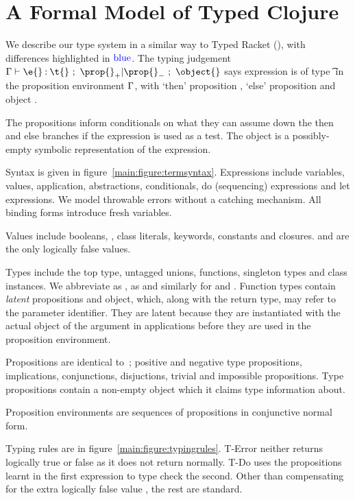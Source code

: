 \section{A Formal Model of Typed Clojure}

We describe our type system in a similar way to Typed Racket (\citet{TF10}),
with differences highlighted in $\mathbin{\textcolor{blue}{\text{blue}}}$.
The typing judgement 
$
{\judgement   {\propenv}
              {\hastype {\e{}} {\t{}}}
  {\filterset {\thenprop {\prop{}}}
              {\elseprop {\prop{}}}}
  {\object{}}}
$
says expression \e{} is of type \t{} in the 
proposition environment $\Gamma{}$, with 
`then' proposition {\thenprop {\prop{}}}, `else' proposition {\elseprop {\prop{}}}
and object \object{}.

The propositions inform conditionals on what they can assume down the then and else
branches if the expression is used as a test.
The object is a possibly-empty symbolic representation of the expression.

Syntax is given in figure~\ref{main:figure:termsyntax}. Expressions include variables, values,
application, abstractions, conditionals, do (sequencing) expressions and let expressions.
We model throwable errors without a catching mechanism. All binding forms introduce fresh
variables.

Values include booleans, \nil{}, class literals, keywords, constants and closures.
\false{} and \nil{} are the only logically false values.

Types include the top type, untagged unions, functions, singleton types
and class instances. We abbreviate \EmptyUnion{} as \Bot{}, \Value{\Nil{}} as \Nil{} and similarly
for \True and \False.
Function types contain \emph{latent} propositions and object, which, along with the return type,
may refer to the parameter identifier. They are latent because they are instantiated with the
actual object of the argument in applications before they are used in the proposition environment.

Propositions are identical to~\cite{TF10}; positive and negative type propositions, implications,
conjunctions, disjuctions, trivial and impossible propositions.
Type propositions contain a non-empty object which it claims type information about.

Proposition environments are sequences of propositions in conjunctive normal form.

Typing rules are in figure~\ref{main:figure:typingrules}.
T-Error neither returns logically true or false as it does not return normally.
T-Do uses the propositions learnt in the first expression to type check the second.
Other than compensating for the extra logically false value \nil{}, the rest are standard.

